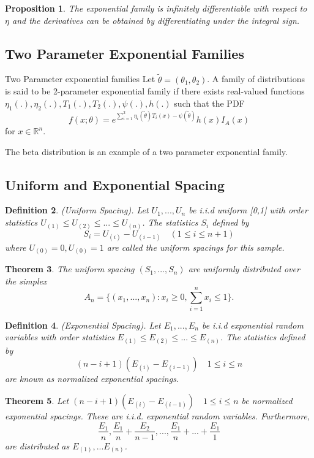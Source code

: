 \documentclass[twoside]{article}
\newcounter{lecnum}
\newtheorem{theorem}{Theorem}[lecnum]
\newtheorem{proposition}[theorem]{Proposition}
\newtheorem{definition}[theorem]{Definition}
\begin{document}
\begin{proposition}The exponential family is infinitely differentiable with respect to $\eta$ and the derivatives can be obtained by differentiating under the integral sign.
\end{proposition}

\subsection{Two Parameter Exponential Families}

\begin{definition_exam}{Two Parameter exponential families}{} Let $\tilde{\theta} = (\theta_1, \theta_2)$. A family of distributions is said to be 2-parameter exponential family if there exists real-valued functions $\eta_1(.), \eta_2(.), T_1(.), T_2(.), \psi(.), h(.)$ such that the PDF 
$$
f(x; \theta) = e^{\sum_{i=1}^2\eta_i(\tilde{\theta})T_i(x) - \psi(\tilde{\theta})}h(x)I_A(x)
$$
for $x \in \mathbb{R}^n.$
\end{definition_exam}

The beta distribution is an example of a two parameter exponential family. 
\subsection{Uniform and Exponential Spacing}
\begin{definition}(Uniform Spacing). Let $U_1,...,U_n$ be i.i.d uniform [0,1] with order statistics $U_{(1)} \leq U_{(2)} \leq ... \leq U_{(n)}$. The statistics $S_i$ defined by 
$$
S_i = U_{(i)} - U_{(i-1)} \quad (1 \leq i \leq n+1)
$$
where $U_{(0)} = 0, U_{(0)} = 1$ are called the uniform spacings for this sample.
\end{definition}

\begin{theorem}The uniform spacing $(S_1,...,S_n)$ are uniformly distributed over the simplex
$$
A_n = \{(x_1,...,x_n): x_i \geq 0, \sum_{i=1}^{n}x_i \leq 1\}.
$$
\end{theorem}

\begin{definition}(Exponential Spacing). Let $E_1,...,E_n$ be i.i.d exponential random variables with order statistics $E_{(1)} \leq E_{(2)} \leq ... \leq E_{(n)}$. The statistics defined by 
$$
(n-i+1)(E_{(i)} - E_{(i-1)}) \quad 1 \leq i \leq n
$$
are known as normalized exponential spacings.
\end{definition}

\begin{theorem} Let $(n-i+1)(E_{(i)} - E_{(i-1)}) \quad 1 \leq i \leq n$ be normalized exponential spacings. These are i.i.d. exponential random variables. Furthermore, 
$$
\frac{E_1}{n},\frac{E_1}{n}+\frac{E_2}{n-1},...,\frac{E_1}{n} + ... + \frac{E_1}{1}
$$
are distributed as $E_{(1)},...E_{(n)}$.
\end{theorem}
\end{document}
